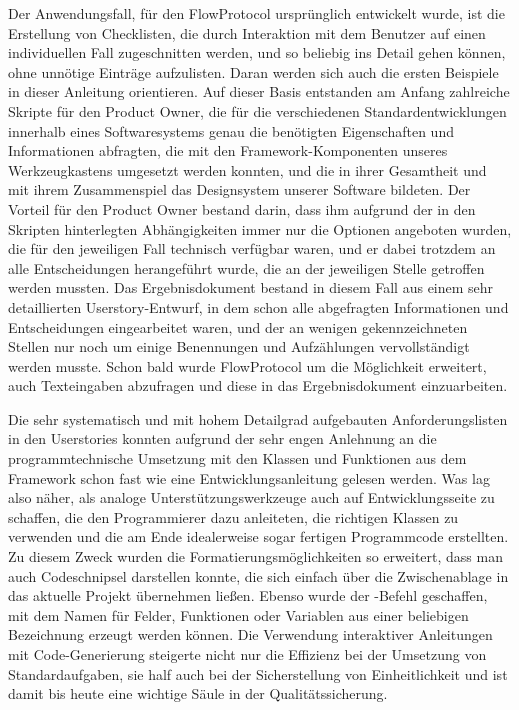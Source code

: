 Der Anwendungsfall, für den FlowProtocol ursprünglich entwickelt wurde, ist die Erstellung von Checklisten, die durch Interaktion mit dem Benutzer auf einen individuellen Fall zugeschnitten werden, und so beliebig ins Detail gehen können, ohne unnötige Einträge aufzulisten. Daran werden sich auch die ersten Beispiele in dieser Anleitung orientieren. Auf dieser Basis entstanden am Anfang zahlreiche Skripte für den Product Owner, die für die verschiedenen Standardentwicklungen innerhalb eines Softwaresystems genau die benötigten Eigenschaften und Informationen abfragten, die mit den Framework-Komponenten unseres Werkzeugkastens umgesetzt werden konnten, und die in ihrer Gesamtheit und mit ihrem Zusammenspiel das Designsystem unserer Software bildeten. Der Vorteil für den Product Owner bestand darin, dass ihm aufgrund der in den Skripten hinterlegten Abhängigkeiten immer nur die Optionen angeboten wurden, die für den jeweiligen Fall technisch verfügbar waren, und er dabei trotzdem an alle Entscheidungen herangeführt wurde, die an der jeweiligen Stelle getroffen werden mussten. Das Ergebnisdokument bestand in diesem Fall aus einem sehr detaillierten Userstory-Entwurf, in dem schon alle abgefragten Informationen und Entscheidungen eingearbeitet waren, und der an wenigen gekennzeichneten Stellen nur noch um einige Benennungen und Aufzählungen vervollständigt werden musste. Schon bald wurde FlowProtocol um die Möglichkeit erweitert, auch Texteingaben abzufragen und diese in das Ergebnisdokument einzuarbeiten.

Die sehr systematisch und mit hohem Detailgrad aufgebauten Anforderungslisten in den Userstories konnten aufgrund der sehr engen Anlehnung an die programmtechnische Umsetzung mit den Klassen und Funktionen aus dem Framework schon fast wie eine Entwicklungsanleitung gelesen werden. Was lag also näher, als analoge Unterstützungswerkzeuge auch auf Entwicklungsseite zu schaffen, die den Programmierer dazu anleiteten, die richtigen Klassen zu verwenden und die am Ende idealerweise sogar fertigen Programmcode erstellten. Zu diesem Zweck wurden die Formatierungsmöglichkeiten so erweitert, dass man auch Codeschnipsel darstellen konnte, die sich einfach über die Zwischenablage in das aktuelle Projekt übernehmen ließen. Ebenso wurde der -Befehl geschaffen, mit dem Namen für Felder, Funktionen oder Variablen aus einer beliebigen Bezeichnung erzeugt werden können. Die Verwendung interaktiver Anleitungen mit Code-Generierung steigerte nicht nur die Effizienz bei der Umsetzung von Standardaufgaben, sie half auch bei der Sicherstellung von Einheitlichkeit und ist damit bis heute eine wichtige Säule in der Qualitätssicherung.

